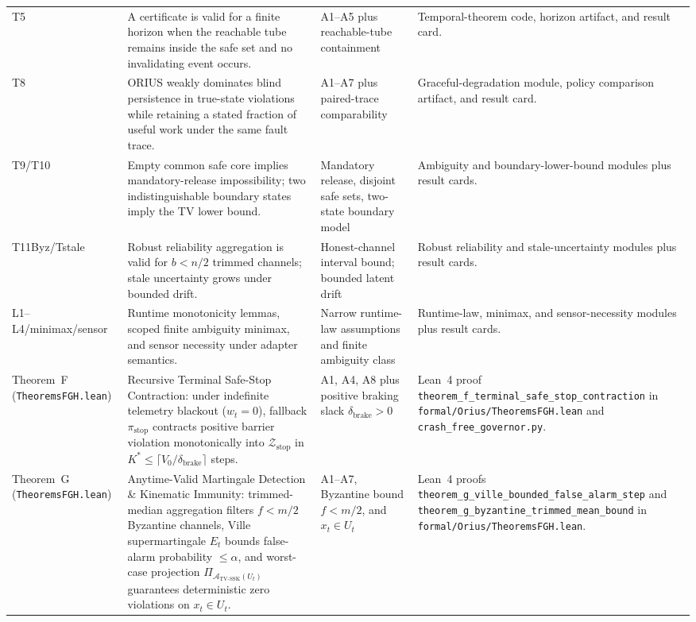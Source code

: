 \begin{longtable}{p{}p{}p{}p{}}
T5 & A certificate is valid for a finite horizon when the reachable tube remains inside the safe set and no invalidating event occurs. & A1--A5 plus reachable-tube containment & Temporal-theorem code, horizon artifact, and result card.\\
T8 & ORIUS weakly dominates blind persistence in true-state violations while retaining a stated fraction of useful work under the same fault trace. & A1--A7 plus paired-trace comparability & Graceful-degradation module, policy comparison artifact, and result card.\\
T9/T10 & Empty common safe core implies mandatory-release impossibility; two indistinguishable boundary states imply the TV lower bound. & Mandatory release, disjoint safe sets, two-state boundary model & Ambiguity and boundary-lower-bound modules plus result cards.\\
T11Byz/\allowbreak Tstale & Robust reliability aggregation is valid for $b<n/2$ trimmed channels; stale uncertainty grows under bounded drift. & Honest-channel interval bound; bounded latent drift & Robust reliability and stale-uncertainty modules plus result cards.\\
L1--L4/\allowbreak minimax/\allowbreak sensor & Runtime monotonicity lemmas, scoped finite ambiguity minimax, and sensor necessity under adapter semantics. & Narrow runtime-law assumptions and finite ambiguity class & Runtime-law, minimax, and sensor-necessity modules plus result cards.\\
Theorem~F (\texttt{Theorems\allowbreak FGH.lean}) & Recursive Terminal Safe-Stop Contraction: under indefinite telemetry blackout ($w_t=0$), fallback $\pi_{\text{stop}}$ contracts positive barrier violation monotonically into $\mathcal{Z}_{\text{stop}}$ in $K^*\le \lceil V_0/\delta_{\text{brake}}\rceil$ steps. & A1, A4, A8 plus positive braking slack $\delta_{\text{brake}}>0$ & Lean~4 proof \texttt{theorem\_\allowbreak f\_\allowbreak terminal\_\allowbreak safe\_\allowbreak stop\_\allowbreak contraction} in \texttt{formal/\allowbreak Orius/\allowbreak TheoremsFGH.lean} and \texttt{crash\_\allowbreak free\_\allowbreak governor.py}.\\
Theorem~G (\texttt{Theorems\allowbreak FGH.lean}) & Anytime-Valid Martingale Detection \& Kinematic Immunity: trimmed-median aggregation filters $f<m/2$ Byzantine channels, Ville supermartingale $E_t$ bounds false-alarm probability $\le\alpha$, and worst-case projection $\Pi_{\mathcal{A}_{\text{TV-SSK}}(U_t)}$ guarantees deterministic zero violations on $x_t\in U_t$. & A1--A7, Byzantine bound $f<m/2$, and $x_t\in U_t$ & Lean~4 proofs \texttt{theorem\_\allowbreak g\_\allowbreak ville\_\allowbreak bounded\_\allowbreak false\_\allowbreak alarm\_\allowbreak step} and \texttt{theorem\_\allowbreak g\_\allowbreak byzantine\_\allowbreak trimmed\_\allowbreak mean\_\allowbreak bound} in \texttt{formal/\allowbreak Orius/\allowbreak TheoremsFGH.lean}.\\

\end{longtable}
